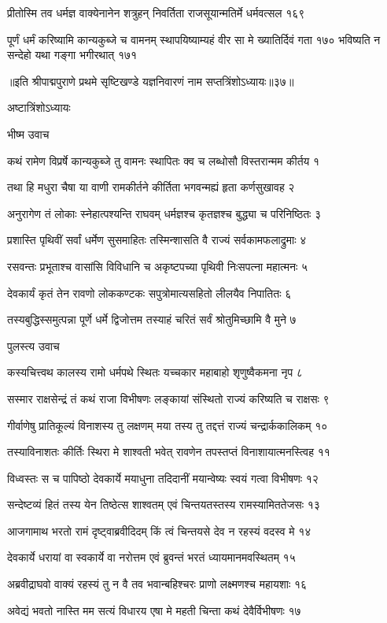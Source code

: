 प्रीतोस्मि तव धर्मज्ञ वाक्येनानेन शत्रुहन्
निवर्तिता राजसूयान्मतिर्मे धर्मवत्सल १६९

पूर्णं धर्मं करिष्यामि कान्यकुब्जे च वामनम्
स्थापयिष्याम्यहं वीर सा मे ख्यातिर्दिवं गता १७०
भविष्यति न सन्देहो यथा गङ्गा भगीरथात् १७१

॥इति श्रीपाद्मपुराणे प्रथमे सृष्टिखण्डे यज्ञनिवारणं नाम सप्तत्रिंशोऽध्यायः॥३७॥

अष्टात्रिंशोऽध्यायः

भीष्म उवाच

कथं रामेण विप्रर्षे कान्यकुब्जे तु वामनः
स्थापितः क्व च लब्धोसौ विस्तरान्मम कीर्तय १

तथा हि मधुरा चैषा या वाणी रामकीर्तने
कीर्तिता भगवन्मह्यं हृता कर्णसुखावह २

अनुरागेण तं लोकाः स्नेहात्पश्यन्ति राघवम्
धर्मज्ञश्च कृतज्ञश्च बुद्ध्या च परिनिष्ठितः ३

प्रशास्ति पृथिवीं सर्वां धर्मेण सुसमाहितः
तस्मिन्शासति वै राज्यं सर्वकामफलाद्रुमाः ४

रसवन्तः प्रभूताश्च वासांसि विविधानि च
अकृष्टपच्या पृथिवी निःसपत्ना महात्मनः ५

देवकार्यं कृतं तेन रावणो लोककण्टकः
सपुत्रोमात्यसहितो लीलयैव निपातितः ६

तस्यबुद्धिस्समुत्पन्ना पूर्णे धर्मे द्विजोत्तम
तस्याहं चरितं सर्वं श्रोतुमिच्छामि वै मुने ७

पुलस्त्य उवाच

कस्यचित्त्वथ कालस्य रामो धर्मपथे स्थितः
यच्चकार महाबाहो शृणुष्वैकमना नृप ८

सस्मार राक्षसेन्द्रं तं कथं राजा विभीषणः
लङ्कायां संस्थितो राज्यं करिष्यति च राक्षसः ९

गीर्वाणेषु प्रातिकूल्यं विनाशस्य तु लक्षणम्
मया तस्य तु तद्दत्तं राज्यं चन्द्रार्ककालिकम् १०

तस्याविनाशतः कीर्तिः स्थिरा मे शाश्वती भवेत्
रावणेन तपस्तप्तं विनाशायात्मनस्त्विह ११

विध्वस्तः स च पापिष्ठो देवकार्ये मयाधुना
तदिदानीं मयान्वेष्यः स्वयं गत्वा विभीषणः १२

सन्देष्टव्यं हितं तस्य येन तिष्ठेत्स शाश्वतम्
एवं चिन्तयतस्तस्य रामस्यामिततेजसः १३

आजगामाथ भरतो रामं दृष्ट्वाब्रवीदिदम्
किं त्वं चिन्तयसे देव न रहस्यं वदस्व मे १४

देवकार्ये धरायां वा स्वकार्ये वा नरोत्तम
एवं ब्रुवन्तं भरतं ध्यायमानमवस्थितम् १५

अब्रवीद्राघवो वाक्यं रहस्यं तु न वै तव
भवान्बहिश्चरः प्राणो लक्ष्मणश्च महायशाः १६

अवेद्यं भवतो नास्ति मम सत्यं विधारय
एषा मे महती चिन्ता कथं देवैर्विभीषणः १७

